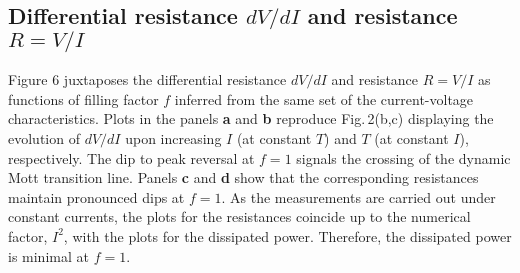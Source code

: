\documentclass[aps,twocolumn,prl,10pt,amsmath,amssymb,nofootinbib,showpacs,superscriptaddress,floatfix]{revtex4-1}
\begin{document}
\subsection{Differential resistance $dV/dI$ and resistance $R=V/I$ }
Figure 6 juxtaposes the differential resistance $dV/dI$ and resistance $R=V/I$ as functions of filling factor $f$ inferred from the same set of the current-voltage characteristics. Plots in the panels \textbf{a} and \textbf{b} reproduce Fig.\,2(b,c) displaying the evolution of $dV/dI$ upon increasing $I$ (at constant $T$) and $T$ (at constant $I$), respectively. The dip to peak reversal at $f=1$ signals the crossing of the dynamic Mott transition line. Panels \textbf{c} and \textbf{d} show that the corresponding resistances maintain pronounced dips at $f=1$.  As the measurements are carried out under constant currents, the plots for the resistances 
coincide up to the numerical factor, $I^2$, with the plots for the dissipated power. 
Therefore, the dissipated power is minimal at $f=1$.
\end{document}
